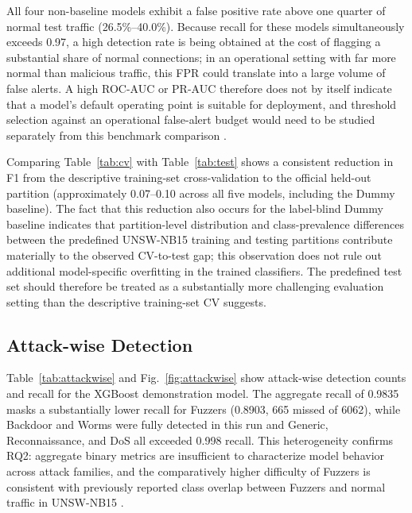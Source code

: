 \documentclass[conference]{IEEEtran}
\begin{document}
All four non-baseline models exhibit a false positive rate above one quarter of normal test traffic (26.5\%--40.0\%). Because recall for these models simultaneously exceeds 0.97, a high detection rate is being obtained at the cost of flagging a substantial share of normal connections; in an operational setting with far more normal than malicious traffic, this FPR could translate into a large volume of false alerts. A high ROC-AUC or PR-AUC therefore does not by itself indicate that a model's default operating point is suitable for deployment, and threshold selection against an operational false-alert budget would need to be studied separately from this benchmark comparison \cite{sommerpaxson2010closed}.

Comparing Table~\ref{tab:cv} with Table~\ref{tab:test} shows a consistent reduction in F1 from the descriptive training-set cross-validation to the official held-out partition (approximately 0.07--0.10 across all five models, including the Dummy baseline). The fact that this reduction also occurs for the label-blind Dummy baseline indicates that partition-level distribution and class-prevalence differences between the predefined UNSW-NB15 training and testing partitions contribute materially to the observed CV-to-test gap; this observation does not rule out additional model-specific overfitting in the trained classifiers. The predefined test set should therefore be treated as a substantially more challenging evaluation setting than the descriptive training-set CV suggests.

\subsection{Attack-wise Detection}
Table~\ref{tab:attackwise} and Fig.~\ref{fig:attackwise} show attack-wise detection counts and recall for the XGBoost demonstration model. The aggregate recall of 0.9835 masks a substantially lower recall for Fuzzers (0.8903, 665 missed of 6062), while Backdoor and Worms were fully detected in this run and Generic, Reconnaissance, and DoS all exceeded 0.998 recall. This heterogeneity confirms RQ2: aggregate binary metrics are insufficient to characterize model behavior across attack families, and the comparatively higher difficulty of Fuzzers is consistent with previously reported class overlap between Fuzzers and normal traffic in UNSW-NB15 \cite{zoghi2024overlap}.
\end{document}
